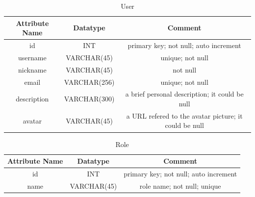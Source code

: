\documentclass[11pt]{homework}
\begin{document}
  \begin{table}[h!]
    \begin{center}
      \caption{User}
      \label{tab:table1}
      \begin{tabular}{c|c|c} %
        \textbf{Attribute Name} & \textbf{Datatype} & \textbf{Comment}\\
        \hline
        id & INT & primary key; not null; auto increment \\
        username & VARCHAR(45) & unique; not null \\
        nickname & VARCHAR(45) & not null \\
        email & VARCHAR(256) & unique; not null \\
        description & VARCHAR(300) & a brief personal description; it could be null \\
        avatar & VARCHAR(45) & a URL refered to the avatar picture; it could be null \\
      \end{tabular}
    \end{center}
  \end{table}

  \begin{table}[h!]
    \begin{center}
      \caption{Role}
      \label{tab:table4}
      \begin{tabular}{c|c|c} %
        \textbf{Attribute Name} & \textbf{Datatype} & \textbf{Comment}\\
        \hline
        id & INT & primary key; not null; auto increment \\
        name & VARCHAR(45) & role name; not null; unique \\
      \end{tabular}
    \end{center}
  \end{table}
\end{document}
